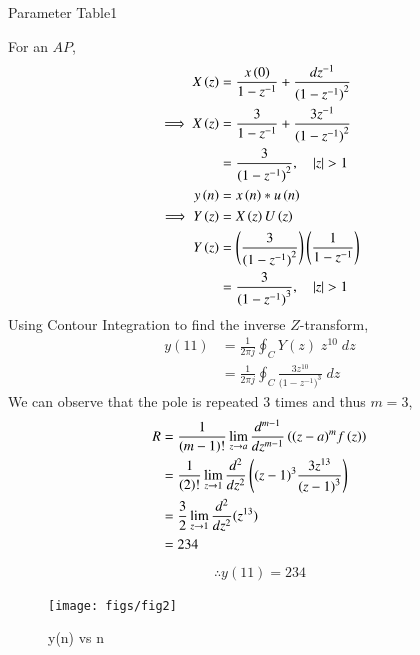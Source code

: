 \documentclass[journal,12pt,twocolumn]{IEEEtran}
\begin{document}
	\begin{table}[ht]
		\centering
		\def\arraystretch{1.5}
		
		\caption{Parameter Table1}
		\label{tab:10.5.3.1}
	\end{table}
	For an $AP$,
	\begin{align}
		X\left(z\right) &= \frac{ x\left(0\right) }{1-z^{-1}} + \frac{dz^{-1}}{{(1-z^{-1})}^{2}}    \\
		\implies X\left(z\right) &= \frac{3}{1-z^{-1}} + \frac{3z^{-1}}{{(1-z^{-1})}^{2}} \\
		&= \frac{3}{({1-z^{-1})}^{2}} ,\quad \left\vert z\right\vert>1    \\
		y\left(n\right)&=x\left(n\right)\ast u\left(n\right)\\
		\implies Y\left(z\right)&=X\left(z\right)U\left(z\right)   \\
		Y\left(z\right)&=\left(\frac{3}{({1-z^{-1})}^{2}}\right)\left(\frac{1}{1-z^{-1}}\right)  \\
		&=\frac{3}{({1-z^{-1})}^{3}} ,\quad \left\vert z\right\vert>1 
	\end{align}
	Using Contour Integration to find the inverse $Z$-transform,
	\begin{align}
		y(11)&=\frac{1}{2\pi j}\oint_{C}Y(z) \;z^{10} \;dz  \\
		&=\frac{1}{2\pi j}\oint_{C}\frac{3z^{10}}{({1-z^{-1})}^{3}} \;dz 
	\end{align}
	We can observe that the pole is repeated $3$ times and thus $m=3$,
	\begin{align}
		R&=\frac{1}{\left(m-1\right)!}\lim\limits_{z\to a}\frac{d^{m-1}}{dz^{m-1}}\left({(z-a)}^{m}f\left(z\right)\right)  \\
		&=\frac{1}{\left(2\right)!}\lim\limits_{z\to 1}\frac{d^{2}}{dz^{2}}\left({(z-1)}^{3}\frac{3z^{13}}{{(z-1)}^3}\right)   \\
		&=\frac{3}{2}\lim\limits_{z\to 1}\frac{d^2}{dz^2}(z^{13})   \\
		&=234
	\end{align}
	\begin{align}
		\therefore \boxed{y(11)=234}
	\end{align}
		\begin{figure}[ht]
		\texttt{[image: figs/fig2]}
		\caption{y(n) vs n}
		\centering
		\label{fig: fig2}
	\end{figure}
\end{document}
